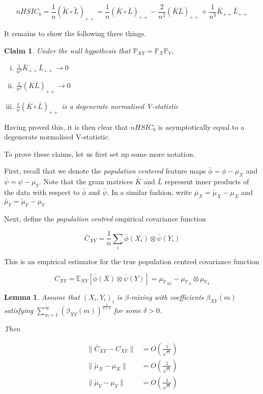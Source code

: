 \documentclass[12pt]{article}
\newtheorem{claim}{Claim}
\newtheorem{lemma}{Lemma}
\numberwithin{claim}{section}
\numberwithin{lemma}{section}
\numberwithin{theorem}{section}
\begin{document}
\[nHSIC_b = \frac{1}{n}(\tilde{K}\circ \tilde{L})_{++} = \frac{1}{n}(\bar{K}\circ \bar{L})_{++} - \frac{2}{n^2}(\bar{K}\bar{L})_{++} + \frac{1}{n^3}\bar{K}_{++}\bar{L}_{++}\]

It remains to show the following three things.

\begin{claim}\label{HSICasym}
Under the null hypothesis that $\mathbb{P}_{XY} = \mathbb{P}_X \mathbb{P}_Y$,

\begin{enumerate}[(i)]
\item \quad $\frac{1}{n^3}\bar{K}_{++}\bar{L}_{++}  \longrightarrow 0$
\item \quad $\frac{1}{n^2}(\bar{K}\bar{L})_{++} \longrightarrow 0$
\item \quad $\frac{1}{n}(\bar{K}\circ \bar{L})_{++} $ is a degenerate normalised V-statistic 
\end{enumerate}

\end{claim}

Having proved this, it is then clear that $nHSIC_b$ is asymptotically equal to a degenerate normalised V-statistic.

To prove these claims, let us first set up some more notation. 

First, recall that we denote the \emph{population centered} feature maps $\bar{\phi} = \phi - \mu_X$ and $\bar{\psi} = \psi - \mu_Y$. Note that the gram matrices $\bar{K}$ and $\bar{L}$ represent inner products of the data with respect to $\bar{\phi}$ and $\bar{\psi}$. In a similar fashion, write $\bar{\mu}_X = \tilde{\mu}_X - \mu_X$ and $\bar{\mu}_Y = \tilde{\mu}_Y - \mu_Y$ 

Next, define the \emph{population centred} empirical covariance function 

\[\bar{C}_{XY} = \frac{1}{n} \sum_i \bar{\phi}(X_i) \otimes \bar{\psi}(Y_i)\]

This is an empirical estimator for the true population centred covariance function

\[C_{XY} = \mathbb{E}_{XY}[ \bar{\phi}(X) \otimes \bar{\psi}(Y)] = \mu_{\mathbb{P}_{XY}} - \mu_{\mathbb{P}_{X}}\otimes \mu_{\mathbb{P}_{Y}}\]

\begin{lemma}\label{lemma:HSICCLT}
Assume that $(X_i,Y_i)_i$ is $\beta$-mixing with coefficients $\beta_{XY}(m)$ satisfying $\sum_{m=1}^\infty (\beta_{XY}(m))^{\frac{\delta}{2+\delta}}$ for some $\delta > 0$.

Then

\begin{align*}
\| \bar{C}_{XY} - C_{XY} \| & = O(\frac{1}{\sqrt{n}}) \\
\| \tilde{\mu}_X  - \mu_X \| & = O(\frac{1}{\sqrt{n}}) \\
\| \tilde{\mu}_Y  - \mu_Y \| & = O(\frac{1}{\sqrt{n}}) \\
\end{align*}
\end{lemma}
\end{document}

